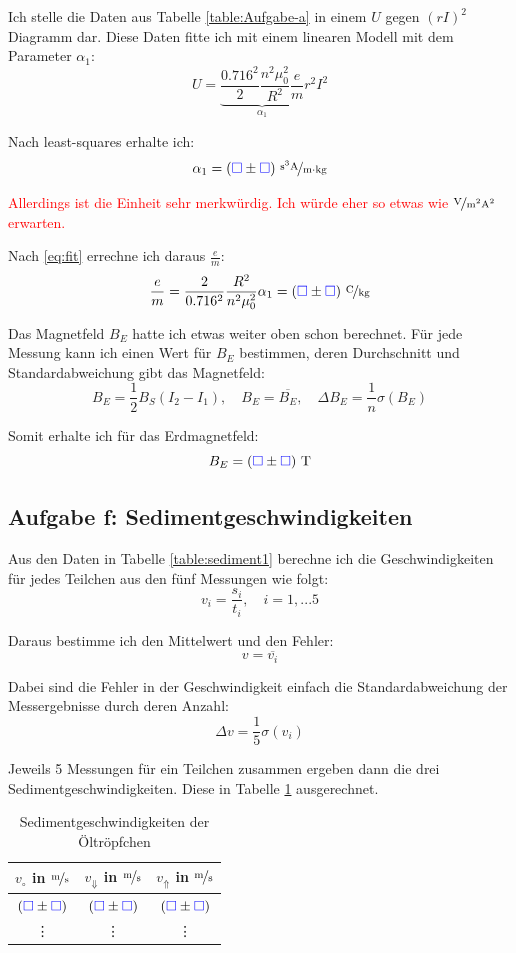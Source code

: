 \documentclass[11pt]{article}
\newcommand{\emesswert}{\left(\messwert \pm \messwert \right)}
\newcommand{\half}{\frac{1}{2}}
\newcommand{\messwert}{\textcolor{blue}{\square}}
\begin{document}
Ich stelle die Daten aus Tabelle \ref{table:Aufgabe-a} in einem $U$ gegen
$(rI)^2$ Diagramm dar. Diese Daten fitte ich mit einem linearen Modell mit dem
Parameter $\alpha_1$:
\[ U = \underbrace{\frac{0.716^2}{2} \frac{n^2 \mu_0^2}{R^2} \frac em}_{\alpha_1} r^2 I^2 \]

Nach least-squares erhalte ich:
\[ \alpha_1 = \unitfrac[\emesswert]{s^3 A}{m \cdot kg} \]

\textcolor{red}{Allerdings ist die Einheit sehr merkwürdig. Ich würde eher so
etwas wie $\unitfrac{V}{m^2 A^2}$ erwarten.}

Nach \eqref{eq:fit} errechne ich daraus $\frac em$:
\[
	\frac em
	= \frac{2}{0.716^2} \frac{R^2}{n^2 \mu_0^2} \alpha_1
	= \unitfrac[\emesswert] C{kg}
\]

Das Magnetfeld $B_E$ hatte ich etwas weiter oben schon berechnet. Für jede
Messung kann ich einen Wert für $B_E$ bestimmen, deren Durchschnitt und
Standardabweichung gibt das Magnetfeld:
\[
	B_E = \half B_S(I_2 - I_1)
	, \quad
	B_E = \overline{B_E}
	, \quad
	\Delta B_E = \frac 1n \sigma(B_E)
\]

Somit erhalte ich für das Erdmagnetfeld:
\[ B_E = \unit[\emesswert] T \]

\subsection{Aufgabe f: Sedimentgeschwindigkeiten}

\label{Auswertung-f}

Aus den Daten in Tabelle \ref{table:sediment1} berechne ich die
Geschwindigkeiten für jedes Teilchen aus den fünf Messungen wie folgt:
\[ v_i = \frac{s_i}{t_i}, \quad i = 1, ... 5 \]

Daraus bestimme ich den Mittelwert und den Fehler:
\[ v = \overline{v_i}  \]

Dabei sind die Fehler in der Geschwindigkeit einfach die Standardabweichung der
Messergebnisse durch deren Anzahl:
\[ \Delta v = \frac 15 \sigma \left( v_i \right) \]

Jeweils 5 Messungen für ein Teilchen zusammen ergeben dann die drei
Sedimentgeschwindigkeiten. Diese in Tabelle \ref{table:sediment2} ausgerechnet.

\begin{table}[h!]
	\centering

	\begin{tabular}{ccc}
		$v_\circ$ in $\unitfrac ms$ & $v_\Downarrow$ in $\unitfrac ms$ & $v_\Uparrow$ in $\unitfrac ms$ \\
		\hline
		$\emesswert$ & $\emesswert$ & $\emesswert$ \\
			   \vdots & \vdots & \vdots
	\end{tabular}

	\caption{Sedimentgeschwindigkeiten der Öltröpfchen}
	\label{table:sediment2}
\end{table}
\end{document}

